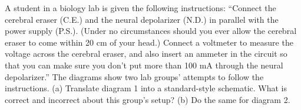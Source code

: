         A student in a biology lab is given the following
        instructions: ``Connect the cerebral eraser (C.E.) and the
        neural depolarizer (N.D.) in parallel with the power supply
        (P.S.).  (Under no circumstances should you ever allow the
        cerebral eraser to come within 20 cm of your head.)  Connect
        a voltmeter to measure the voltage across the cerebral
        eraser, and also insert an ammeter in the circuit so that
        you can make sure you don't put more than 100 mA through the
        neural depolarizer.''  The diagrams show two lab groups'
        attempts to follow the instructions.  \hwendpart
        (a) Translate diagram
        1 into a standard-style schematic. What is correct and
        incorrect about this group's setup?  \hwendpart
        (b) Do the same for diagram 2.
